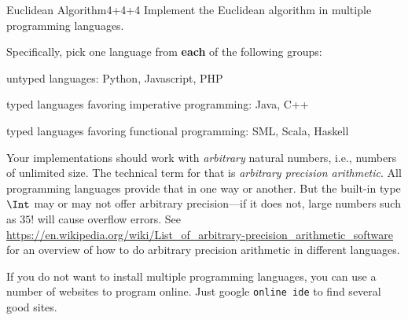 \documentclass[a4paper]{article}
\begin{document}
\header


\begin{problem}{Euclidean Algorithm}{4+4+4}
Implement the Euclidean algorithm in multiple programming languages.

Specifically, pick one language from \textbf{each} of the following groups:
\begin{compactitem}
 \item untyped languages: Python, Javascript, PHP
 \item typed languages favoring imperative programming: Java, C++
 \item typed languages favoring functional programming: SML, Scala, Haskell
\end{compactitem}

Your implementations should work with \emph{arbitrary} natural numbers, i.e., numbers of unlimited size.
The technical term for that is \emph{arbitrary precision arithmetic}.
All programming languages provide that in one way or another.
But the built-in type $\Int$ may or may not offer arbitrary precision---if it does not, large numbers such as $35!$ will cause overflow errors.
See \url{https://en.wikipedia.org/wiki/List_of_arbitrary-precision_arithmetic_software} for an overview of how to do arbitrary precision arithmetic in different languages.

\begin{hint}
If you do not want to install multiple programming languages, you can use a number of websites to program online.
Just google \verb|online ide| to find several good sites.
\end{hint}
\end{problem}
\end{document}
